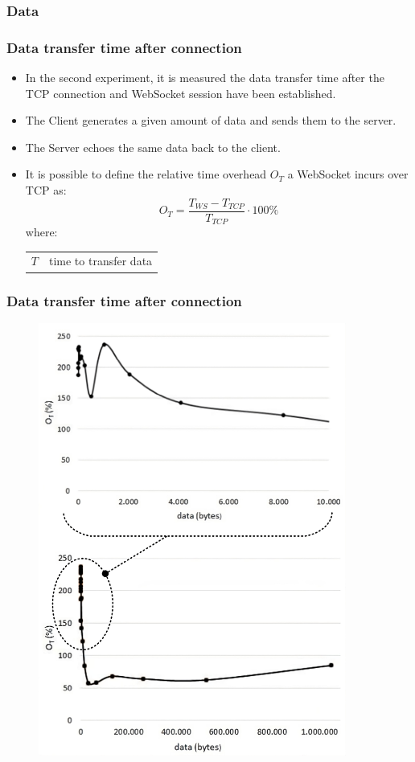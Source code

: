 \documentclass{beamer}
\makeatletter
\newenvironment{conditions}
  {\par\vspace{\abovedisplayskip}\noindent\begin{tabular}{>{$}l<{$} @{${}={}$} l}}
  {\end{tabular}\par\vspace{\belowdisplayskip}}
\makeatother
\begin{document}

\subsubsection{Data}
\begin{frame}
    \frametitle{Data transfer time after connection}
    \begin{itemize}[<+->]
        \item In the second experiment, it is measured the data transfer time after the TCP
              connection and WebSocket session have been established.
        \item The Client generates a given amount of data and sends them to the server.
        \item The Server echoes the same data back to the client.
        \item It is possible to define the \alert{relative time overhead $O_T$} a WebSocket
              incurs over TCP as:
              \begin{equation}
                  O_T = \frac{T_{WS} - T_{TCP}}{T_{TCP}}\cdot 100\%
              \end{equation}
              where:
              \begin{conditions}
                  T & time to transfer data
              \end{conditions}
    \end{itemize}
\end{frame}

\begin{frame}
    \frametitle{Data transfer time after connection}
    \begin{figure}
        \includegraphics[width=0.9\textwidth,height=0.8\textwidth]{images/data_transfer_time.jpeg}
    \end{figure}
\end{frame}
\end{document}
